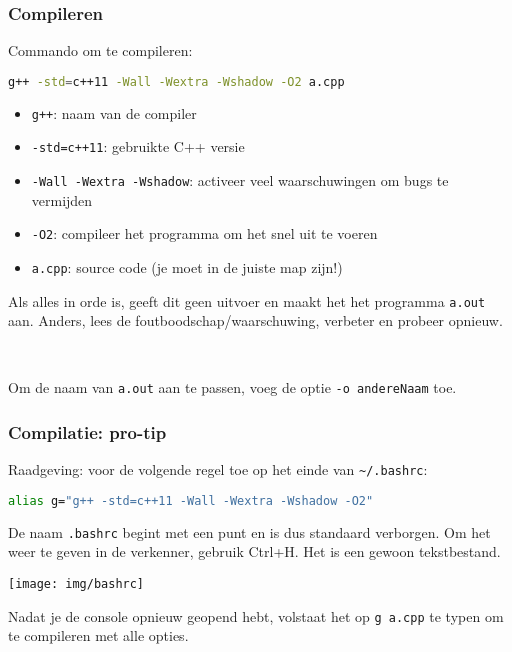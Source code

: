 \documentclass[12pt]{beamer}
\begin{document}
\begin{frame}[fragile]
\frametitle{Compileren}
Commando om te compileren:
\begin{lstlisting}[language=bash]
g++ -std=c++11 -Wall -Wextra -Wshadow -O2 a.cpp
\end{lstlisting}
\begin{itemize}
\item \lstinline|g++|: naam van de compiler
\item \lstinline|-std=c++11|: gebruikte C++ versie
\item \lstinline|-Wall -Wextra -Wshadow|: activeer veel waarschuwingen om bugs te vermijden
\item \lstinline|-O2|: compileer het programma om het snel uit te voeren
\item \lstinline|a.cpp|: source code (je moet in de juiste map zijn!)
\end{itemize}
Als alles in orde is, geeft dit geen uitvoer en maakt het het programma \lstinline|a.out| aan. Anders, lees de foutboodschap/waarschuwing, verbeter en probeer opnieuw.

~

Om de naam van \lstinline|a.out| aan te passen, voeg de optie \lstinline|-o andereNaam| toe.
\end{frame}

\begin{frame}[fragile]
\frametitle{Compilatie: pro-tip}
    Raadgeving: voor de volgende regel toe op het einde van \lstinline|~/.bashrc|:
\begin{lstlisting}[language=bash]
alias g="g++ -std=c++11 -Wall -Wextra -Wshadow -O2"
\end{lstlisting}
De naam \lstinline|.bashrc| begint met een punt en is dus standaard verborgen. Om het weer te geven in de verkenner, gebruik Ctrl+H. Het is een gewoon tekstbestand.
\begin{center}
\texttt{[image: img/bashrc]}
\end{center}

Nadat je de console opnieuw geopend hebt, volstaat het op \lstinline|g a.cpp| te typen om te compileren met alle opties.
\end{frame}
\end{document}
